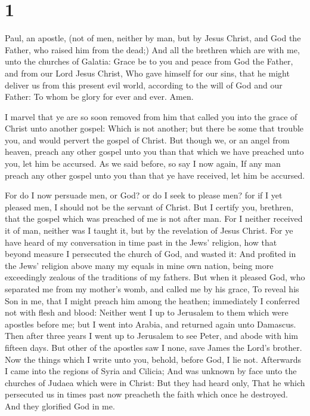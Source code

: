 \hypertarget{section}{%
\section{1}\label{section}}

 Paul, an apostle, (not of men, neither by man, but by
Jesus Christ, and God the Father, who raised him from the dead;)
 And all the brethren which are with me, unto the churches
of Galatia:  Grace be to you and peace from God the
Father, and from our Lord Jesus Christ,  Who gave himself
for our sins, that he might deliver us from this present evil world,
according to the will of God and our Father:  To whom be
glory for ever and ever. Amen.

 I marvel that ye are so soon removed from him that called
you into the grace of Christ unto another gospel:  Which
is not another; but there be some that trouble you, and would pervert
the gospel of Christ.  But though we, or an angel from
heaven, preach any other gospel unto you than that which we have
preached unto you, let him be accursed.  As we said
before, so say I now again, If any man preach any other gospel unto you
than that ye have received, let him be accursed.

 For do I now persuade men, or God? or do I seek to
please men? for if I yet pleased men, I should not be the servant of
Christ.  But I certify you, brethren, that the gospel
which was preached of me is not after man.  For I neither
received it of man, neither was I taught it, but by the revelation of
Jesus Christ.  For ye have heard of my conversation in
time past in the Jews' religion, how that beyond measure I persecuted
the church of God, and wasted it:  And profited in the
Jews' religion above many my equals in mine own nation, being more
exceedingly zealous of the traditions of my fathers.  But
when it pleased God, who separated me from my mother's womb, and called
me by his grace,  To reveal his Son in me, that I might
preach him among the heathen; immediately I conferred not with flesh and
blood:  Neither went I up to Jerusalem to them which were
apostles before me; but I went into Arabia, and returned again unto
Damascus.  Then after three years I went up to Jerusalem
to see Peter, and abode with him fifteen days.  But other
of the apostles saw I none, save James the Lord's brother.
 Now the things which I write unto you, behold, before
God, I lie not.  Afterwards I came into the regions of
Syria and Cilicia;  And was unknown by face unto the
churches of Judaea which were in Christ:  But they had
heard only, That he which persecuted us in times past now preacheth the
faith which once he destroyed.  And they glorified God in
me.

